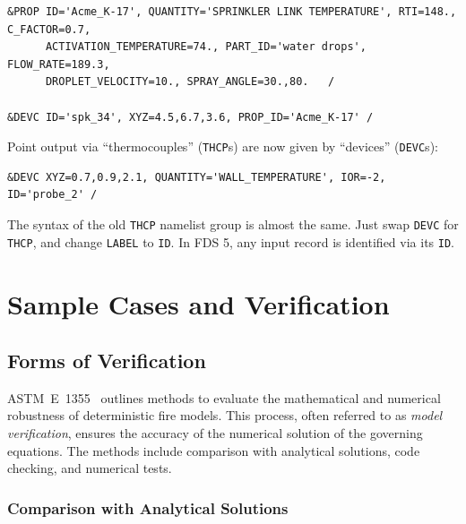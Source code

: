 \documentclass[11pt]{book}
\newcommand{\ct}{\tt\small}
\begin{document}
\footnotesize
\begin{verbatim}
&PROP ID='Acme_K-17', QUANTITY='SPRINKLER LINK TEMPERATURE', RTI=148., C_FACTOR=0.7,
      ACTIVATION_TEMPERATURE=74., PART_ID='water drops', FLOW_RATE=189.3,
      DROPLET_VELOCITY=10., SPRAY_ANGLE=30.,80.   /

&DEVC ID='spk_34', XYZ=4.5,6.7,3.6, PROP_ID='Acme_K-17' /
\end{verbatim} \normalsize

\noindent
Point output via ``thermocouples'' ({\ct THCP}s) are now given by ``devices'' ({\ct DEVC}s):

\footnotesize
\begin{verbatim}
&DEVC XYZ=0.7,0.9,2.1, QUANTITY='WALL_TEMPERATURE', IOR=-2, ID='probe_2' /
\end{verbatim}
\normalsize

\noindent
The syntax of the old {\ct THCP} namelist group is almost the same. Just swap {\ct DEVC} for {\ct THCP}, and change {\ct LABEL} to
{\ct ID}. In FDS 5, any input record is identified via its {\ct ID}.






\part{Sample Cases and Verification}
\label{part:verification}



\chapter{Forms of Verification}

ASTM~E~1355~\cite{ASTM:E1355} outlines methods to evaluate the
mathematical and numerical robustness of deterministic fire
models. This process, often referred to as {\em model verification},
ensures the accuracy of the numerical solution of the governing
equations. The methods include comparison with analytical solutions,
code checking, and numerical tests.

\section{Comparison with Analytical Solutions}
\label{Analytical Tests}
\end{document}
